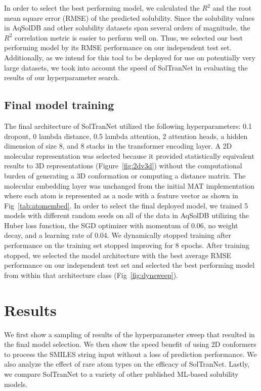 \documentclass[journal=jmcmar,manuscript=article]{achemso}
\begin{document}
In order to select the best performing model, we calculated the $R^2$ and the root mean square error (RMSE) of the predicted solubility.
Since the solubility values in AqSolDB and other solubility datasets span several orders of magnitude, the $R^2$ correlation metric is easier to perform well on.
Thus, we selected our best performing model by its RMSE performance on our independent test set.
Additionally, as we intend for this tool to be deployed for use on potentially very large datasets, we took into account the speed of SolTranNet in evaluating the results of our hyperparameter search. 

\subsection{Final model training}
The final architecture of SolTranNet utilized the following hyperparameters: 0.1 dropout, 0 lambda distance, 0.5 lambda attention, 2 attention heads, a hidden dimension of size 8, and 8 stacks in the transformer encoding layer. A 2D molecular representation was selected because it provided statistically equivalent results to 3D representations (Figure~\ref{fig:2dv3d}) without the computational burden of generating a 3D conformation or computing a distance matrix.
The molecular embedding layer was unchanged from the initial MAT implementation\cite{MAT} where each atom is represented as a node with a feature vector as shown in Fig~\ref{tab:atomembed}.
In order to select the final deployed model, we trained 5 models with different random seeds on all of the data in AqSolDB utilizing the Huber loss function, the SGD optimizer with momentum of 0.06, no weight decay, and a learning rate of 0.04.
We dynamically stopped training after performance on the training set stopped improving for 8 epochs.
After training stopped, we selected the model architecture with the best average RMSE performance on our independent test set and selected the best performing model from within that architecture class (Fig~\ref{fig:dynsweep}).

\section{Results}

We first show a sampling of results of the hyperparameter sweep that resulted in the final model selection.
We then show the speed benefit of using 2D conformers to process the SMILES string input without a loss of prediction performance.
We also analyze the effect of rare atom types on the efficacy of SolTranNet.
Lastly, we compare SolTranNet to a variety of other published ML-based solubility models.
\end{document}
